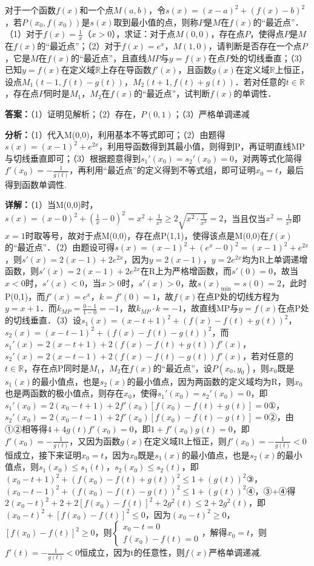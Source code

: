 \begin{question}[points=18]
对于一个函数$f(x)$和一个点$M(a,b)$，令$s(x)=(x-a)^2+(f(x)-b)^2$，若$P(x_0,f(x_0))$是$s(x)$取到最小值的点，则称$P$是$M$在$f(x)$的“最近点”．（1）对于$f(x)=\frac1x$（$x>0$），求证：对于点$M(0,0)$，存在点$P$，使得点$P$是$M$在$f(x)$的“最近点”；（2）对于$f(x)=e^x$，$M(1,0)$，请判断是否存在一个点$P$，它是$M$在$f(x)$的“最近点”，且直线$MP$与$y=f(x)$在点$P$处的切线垂直；（3）已知$y=f(x)$在定义域$\mathbb{R}$上存在导函数$f'(x)$，且函数$g(x)$在定义域$\mathbb{R}$上恒正，设点$M_1(t-1,f(t)-g(t))$，$M_2(t+1,f(t)+g(t))$．若对任意的$t\in\mathbb{R}$，存在点$P$同时是$M_1$，$M_2$在$f(x)$的“最近点”，试判断$f(x)$的单调性．
\begin{solution}
\textbf{答案：}（1）证明见解析；（2）存在，$P(0,1)$；（3）严格单调递减

\textbf{分析：}（1）代入M(0,0)，利用基本不等式即可；（2）由题得$s(x)=(x-1)^2+e^{2x}$，利用导函数得到其最小值，则得到P，再证明直线MP与切线垂直即可；（3）根据题意得到$s_1'(x_0)=s_2'(x_0)=0$，对两等式化简得$f'(x_0)=-\frac1{g(t)}$，再利用“最近点”的定义得到不等式组，即可证明$x_0=t$，最后得到函数单调性.

\textbf{详解：}（1）当M(0,0)时，$s(x)=(x-0)^2+(\frac1x-0)^2=x^2+\frac1{x^2}\ge2\sqrt{x^2\cdot\frac1{x^2}}=2$，当且仅当$x^2=\frac1{x^2}$即$x=1$时取等号，故对于点M(0,0)，存在点P(1,1)，使得该点是M(0,0)在$f(x)$的“最近点”．（2）由题设可得$s(x)=(x-1)^2+(e^x-0)^2=(x-1)^2+e^{2x}$，则$s'(x)=2(x-1)+2e^{2x}$，因为$y=2(x-1)$，$y=2e^{2x}$均为R上单调递增函数，则$s'(x)=2(x-1)+2e^{2x}$在R上为严格增函数，而$s'(0)=0$，故当$x<0$时，$s'(x)<0$，当$x>0$时，$s'(x)>0$，故$s(x)_{\min}=s(0)=2$，此时P(0,1)，而$f'(x)=e^x$，$k=f'(0)=1$，故$f(x)$在点P处的切线方程为$y=x+1$．而$k_{MP}=\frac{0-1}{1-0}=-1$，故$k_{MP}\cdot k=-1$，故直线MP与$y=f(x)$在点P处的切线垂直．（3）设$s_1(x)=(x-t+1)^2+(f(x)-f(t)+g(t))^2$，$s_2(x)=(x-t-1)^2+(f(x)-f(t)-g(t))^2$，而$s_1'(x)=2(x-t+1)+2(f(x)-f(t)+g(t))f'(x)$，$s_2'(x)=2(x-t-1)+2(f(x)-f(t)-g(t))f'(x)$，若对任意的$t\in\mathbb{R}$，存在点P同时是$M_1$，$M_2$在$f(x)$的“最近点”，设$P(x_0,y_0)$，则$x_0$既是$s_1(x)$的最小值点，也是$s_2(x)$的最小值点，因为两函数的定义域均为R，则$x_0$也是两函数的极小值点，则存在$x_0$，使得$s_1'(x_0)=s_2'(x_0)=0$，即$s_1'(x_0)=2(x_0-t+1)+2f'(x_0)[f(x_0)-f(t)+g(t)]=0$①，$s_2'(x_0)=2(x_0-t-1)+2f'(x_0)[f(x_0)-f(t)-g(t)]=0$②，由①②相等得$4+4g(t)f'(x_0)=0$，即$1+f'(x_0)g(t)=0$，即$f'(x_0)=-\frac1{g(t)}$，又因为函数$g(x)$在定义域R上恒正，则$f'(x_0)=-\frac1{g(t)}<0$恒成立，接下来证明$x_0=t$，因为$x_0$既是$s_1(x)$的最小值点，也是$s_2(x)$的最小值点，则$s_1(x_0)\le s_1(t)$，$s_2(x_0)\le s_2(t)$，即$(x_0-t+1)^2+(f(x_0)-f(t)+g(t))^2\le1+(g(t))^2$③，$(x_0-t-1)^2+(f(x_0)-f(t)-g(t))^2\le1+(g(t))^2$④，③+④得$2(x_0-t)^2+2+2[f(x_0)-f(t)]^2+2g^2(t)\le2+2g^2(t)$，即$(x_0-t)^2+[f(x_0)-f(t)]^2\le0$，因为$(x_0-t)^2\ge0$，$[f(x_0)-f(t)]^2\ge0$，则$\begin{cases} x_0-t=0 \\ f(x_0)-f(t)=0 \end{cases}$，解得$x_0=t$，则$f'(t)=-\frac1{g(t)}<0$恒成立，因为t的任意性，则$f(x)$严格单调递减.
\end{solution}
\end{question}

